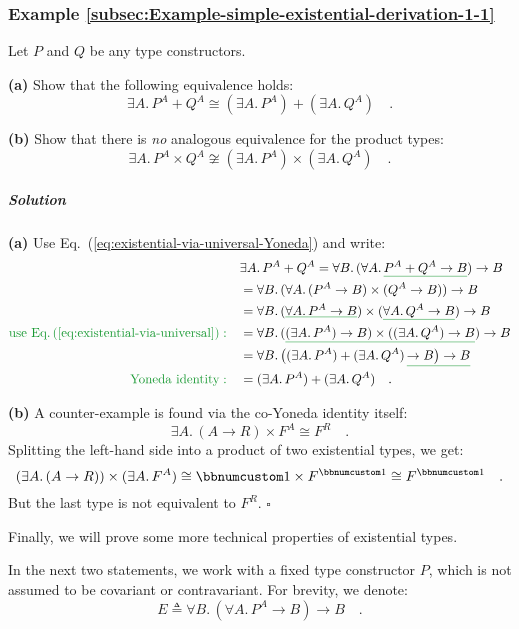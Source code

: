 \subsubsection{Example \label{subsec:Example-simple-existential-derivation-1-1}\ref{subsec:Example-simple-existential-derivation-1-1}}

Let $P$ and $Q$ be any type constructors.

\textbf{(a)} Show that the following equivalence holds: 
\[
\exists A.\,P^{A}+Q^{A}\cong(\exists A.\,P^{A})+(\exists A.\,Q^{A})\quad.
\]

\textbf{(b)} Show that there is \emph{no} analogous equivalence for
the product types:
\[
\exists A.\,P^{A}\times Q^{A}\not\cong(\exists A.\,P^{A})\times(\exists A.\,Q^{A})\quad.
\]


\subparagraph{Solution}

\textbf{(a)} Use Eq.~(\ref{eq:existential-via-universal-Yoneda})
and write:
\begin{align*}
 & \exists A.\,P^{A}+Q^{A}=\forall B.\,(\forall A.\,\gunderline{P^{A}+Q^{A}\rightarrow B})\rightarrow B\\
 & =\forall B.\,(\forall A.\,(P^{A}\rightarrow B)\times(Q^{A}\rightarrow B))\rightarrow B\\
 & =\forall B.\,(\gunderline{\forall A.\,P^{A}\rightarrow B})\times(\gunderline{\forall A.\,Q^{A}\rightarrow B})\rightarrow B\\
{\color{greenunder}\text{use Eq.\,(\ref{eq:existential-via-universal})}:}\quad & =\forall B.\,(\gunderline{(\exists A.\,P^{A})\rightarrow B)\times((\exists A.\,Q^{A})\rightarrow B})\rightarrow B\\
 & =\forall B.\,\big((\exists A.\,P^{A})+(\exists A.\,Q^{A})\,\gunderline{\rightarrow B\big)\rightarrow B}\\
{\color{greenunder}\text{Yoneda identity}:}\quad & =(\exists A.\,P^{A})+(\exists A.\,Q^{A})\quad.
\end{align*}

\textbf{(b)} A counter-example is found via the co-Yoneda identity
itself:
\[
\exists A.\,(A\rightarrow R)\times F^{A}\cong F^{R}\quad.
\]
Splitting the left-hand side into a product of two existential types,
we get:
\[
(\exists A.\,(A\rightarrow R))\times(\exists A.\,F^{A})\cong\bbnum 1\times F^{\bbnum 1}\cong F^{\bbnum 1}\quad.
\]
But the last type is not equivalent to $F^{R}$. $\square$

Finally, we will prove some more technical properties of existential
types.

In the next two statements, we work with a fixed type constructor
$P$, which is not assumed to be covariant or contravariant. For brevity,
we denote:
\[
E\triangleq\forall B.\,(\forall A.\,P^{A}\rightarrow B)\rightarrow B\quad.
\]


